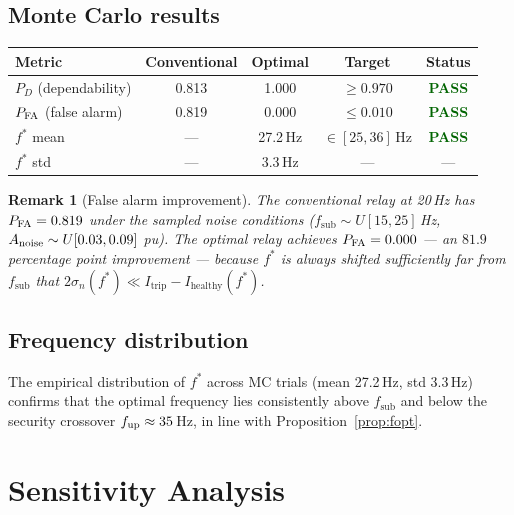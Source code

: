 \documentclass[11pt,a4paper]{article}
\newtheorem{remark}{Remark}
\newcommand{\Ihealthy}{I_{\mathrm{healthy}}}
\newcommand{\Itrip}{I_{\mathrm{trip}}}
\newcommand{\sigman}{\sigma_n}
\newcommand{\fopt}{f^*}
\newcommand{\fsub}{f_{\mathrm{sub}}}
\begin{document}
\subsection{Monte Carlo results}
\label{sec:mc_results}

\begin{center}
\begin{tabular}{lcccc}
  \toprule
  Metric & Conventional & Optimal & Target & Status \\
  \midrule
  $P_D$ (dependability) & 0.813 & 1.000 & $\geq 0.970$
    & \textcolor{darkgreen}{\textbf{PASS}} \\
  $P_{\rm FA}$ (false alarm) & 0.819 & 0.000 & $\leq 0.010$
    & \textcolor{darkgreen}{\textbf{PASS}} \\
  $\fopt$ mean & — & 27.2\,Hz & $\in [25, 36]$\,Hz
    & \textcolor{darkgreen}{\textbf{PASS}} \\
  $\fopt$ std  & — & 3.3\,Hz  & —
    & — \\
  \bottomrule
\end{tabular}
\end{center}

\begin{remark}[False alarm improvement]
  The conventional relay at 20\,Hz has $P_{\rm FA} = 0.819$ under the sampled
  noise conditions ($\fsub \sim U[15,25]$\,Hz, $A_{\rm noise} \sim U[0.03,0.09]$
  pu).  The optimal relay achieves $P_{\rm FA} = 0.000$ --- an $81.9$ percentage
  point improvement --- because $\fopt$ is always shifted sufficiently far from
  $\fsub$ that $2\sigman(\fopt) \ll \Itrip - \Ihealthy(\fopt)$.
\end{remark}

\subsection{Frequency distribution}

The empirical distribution of $\fopt$ across MC trials (mean 27.2\,Hz, std
3.3\,Hz) confirms that the optimal frequency lies consistently above $\fsub$
and below the security crossover $f_{\rm up} \approx 35$\,Hz, in line with
Proposition~\ref{prop:fopt}.

\section{Sensitivity Analysis}
\label{sec:sensitivity}
\end{document}
